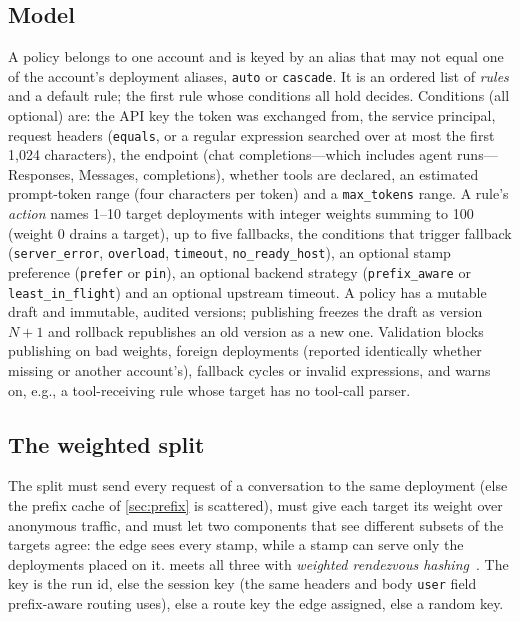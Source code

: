 \documentclass[conference,letterpaper]{IEEEtran}
\newcommand{\code}[1]{\texttt{\small #1}}
\begin{document}
\subsection{Model}
A policy belongs to one account and is keyed by an alias that may not equal one of the
account's deployment aliases, \code{auto} or \code{cascade}. It is an ordered list of
\emph{rules} and a default rule; the first rule whose conditions all hold decides. Conditions
(all optional) are: the API key the token was exchanged from, the service principal, request
headers (\code{equals}, or a regular expression searched over at most the first 1{,}024
characters), the endpoint (chat completions---which includes agent runs---Responses, Messages,
completions), whether tools are declared, an estimated prompt-token range (four characters per
token) and a \code{max\_tokens} range. A rule's \emph{action} names 1--10 target deployments
with integer weights summing to 100 (weight 0 drains a target), up to five fallbacks, the
conditions that trigger fallback (\code{server\_error}, \code{overload}, \code{timeout},
\code{no\_ready\_host}), an optional stamp preference (\code{prefer} or \code{pin}), an
optional backend strategy (\code{prefix\_aware} or \code{least\_in\_flight}) and an optional
upstream timeout. A policy has a mutable draft and immutable, audited versions; publishing
freezes the draft as version $N{+}1$ and rollback republishes an old version as a new one.
Validation blocks publishing on bad weights, foreign deployments (reported identically whether
missing or another account's), fallback cycles or invalid expressions, and warns on, e.g., a
tool-receiving rule whose target has no tool-call parser.

\subsection{The weighted split}
The split must send every request of a conversation to the same deployment (else the prefix
cache of \cref{sec:prefix} is scattered), must give each target its weight over anonymous
traffic, and must let two components that see different subsets of the targets agree: the
edge sees every stamp, while a stamp can serve only the deployments placed on it.
 meets all three with \emph{weighted rendezvous hashing}~\cite{rendezvous,
weighteddht}. The key is the run id, else the session key (the same headers and body
\code{user} field prefix-aware routing uses), else a route key the edge assigned, else a
random key.
\end{document}
